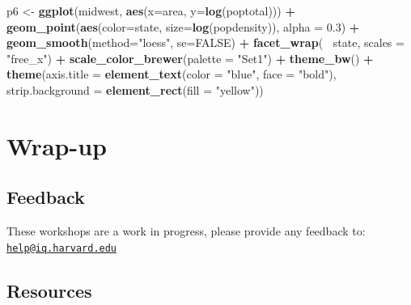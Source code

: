 \documentclass[
]{book}
\newenvironment{Shaded}{\begin{snugshade}}{\end{snugshade}}
\newcommand{\DataTypeTok}[1]{\textcolor[rgb]{0.13,0.29,0.53}{#1}}
\newcommand{\FloatTok}[1]{\textcolor[rgb]{0.00,0.00,0.81}{#1}}
\newcommand{\KeywordTok}[1]{\textcolor[rgb]{0.13,0.29,0.53}{\textbf{#1}}}
\newcommand{\NormalTok}[1]{#1}
\newcommand{\OperatorTok}[1]{\textcolor[rgb]{0.81,0.36,0.00}{\textbf{#1}}}
\newcommand{\OtherTok}[1]{\textcolor[rgb]{0.56,0.35,0.01}{#1}}
\newcommand{\StringTok}[1]{\textcolor[rgb]{0.31,0.60,0.02}{#1}}
\begin{document}
\begin{Shaded}
\begin{Highlighting}[]
\NormalTok{p6 <-}\StringTok{ }\KeywordTok{ggplot}\NormalTok{(midwest, }\KeywordTok{aes}\NormalTok{(}\DataTypeTok{x=}\NormalTok{area, }\DataTypeTok{y=}\KeywordTok{log}\NormalTok{(poptotal))) }\OperatorTok{+}
\StringTok{    }\KeywordTok{geom_point}\NormalTok{(}\KeywordTok{aes}\NormalTok{(}\DataTypeTok{color=}\NormalTok{state, }\DataTypeTok{size=}\KeywordTok{log}\NormalTok{(popdensity)), }\DataTypeTok{alpha =} \FloatTok{0.3}\NormalTok{) }\OperatorTok{+}
\StringTok{    }\KeywordTok{geom_smooth}\NormalTok{(}\DataTypeTok{method=}\StringTok{"loess"}\NormalTok{, }\DataTypeTok{se=}\OtherTok{FALSE}\NormalTok{) }\OperatorTok{+}
\StringTok{    }\KeywordTok{facet_wrap}\NormalTok{(}\OperatorTok{~}\StringTok{ }\NormalTok{state, }\DataTypeTok{scales =} \StringTok{"free_x"}\NormalTok{) }\OperatorTok{+}
\StringTok{    }\KeywordTok{scale_color_brewer}\NormalTok{(}\DataTypeTok{palette =} \StringTok{"Set1"}\NormalTok{) }\OperatorTok{+}
\StringTok{    }\KeywordTok{theme_bw}\NormalTok{() }\OperatorTok{+}
\StringTok{    }\KeywordTok{theme}\NormalTok{(}\DataTypeTok{axis.title =} \KeywordTok{element_text}\NormalTok{(}\DataTypeTok{color =} \StringTok{"blue"}\NormalTok{, }\DataTypeTok{face =} \StringTok{"bold"}\NormalTok{),}
         \DataTypeTok{strip.background =} \KeywordTok{element_rect}\NormalTok{(}\DataTypeTok{fill =} \StringTok{"yellow"}\NormalTok{))}
\end{Highlighting}
\end{Shaded}

\hypertarget{wrap-up-3}{%
\section{Wrap-up}\label{wrap-up-3}}

\hypertarget{feedback-3}{%
\subsection{Feedback}\label{feedback-3}}

These workshops are a work in progress, please provide any feedback to: \href{mailto:help@iq.harvard.edu}{\nolinkurl{help@iq.harvard.edu}}

\hypertarget{resources-4}{%
\subsection{Resources}\label{resources-4}}
\end{document}
